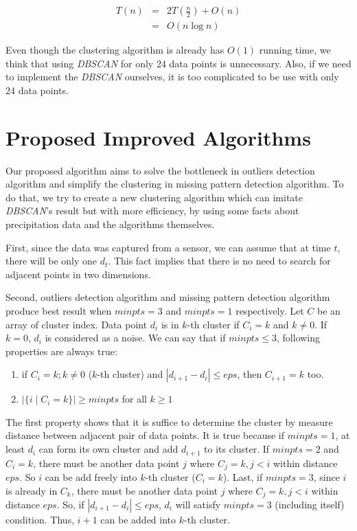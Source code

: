 \documentclass[conference]{IEEEtran}
\begin{document}
\[
\begin{array}{lcl}
T(n) & = & 2T(\frac{n}{2}) + O(n)\\
     & = & O(n \log{n})
\end{array}
\]

Even though the clustering algorithm is already has $O(1)$ running time, we think that using \textit{DBSCAN} for only 24 data points is unnecessary. Also, if we need to implement the \textit{DBSCAN} ourselves, it is too complicated to be use with only 24 data points.

\section{Proposed Improved Algorithms} \label{sec:propose}

Our proposed algorithm aims to solve the bottleneck in outliers detection algorithm and simplify the clustering in missing pattern detection algorithm. To do that, we try to create a new clustering algorithm which can imitate \textit{DBSCAN}'s result but with more efficiency, by using some facts about precipitation data and the algorithms themselves.

First, since the data was captured from a sensor, we can assume that at time $t$, there will be only one $d_{t}$. This fact implies that there is no need to search for adjacent points in two dimensions.

Second, outliers detection algorithm and missing pattern detection algorithm produce best result when $\textit{minpts} = 3$ and $\textit{minpts} = 1$ respectively. Let $C$ be an array of cluster index. Data point $d_{i}$ is in $k$-th cluster if $C_{i} = k$ and $k \neq 0$. If $k = 0$, $d_{i}$ is considered as a noise. We can say that if $\textit{minpts} \le 3$, following properties are always true:

\begin{enumerate}
  \item if $C_{i} = k; k \neq 0$ (\textit{$k$}-th cluster) and $|d_{i+1} - d_{i}| \le \textit{eps}$, then $C_{i+1} = k$ too.
  \item $|\{i \mid C_{i} = k\}| \ge \textit{minpts}$ for all $k \ge 1$ 
\end{enumerate}

The first property shows that it is suffice to determine the cluster by measure distance between adjacent pair of data points. It is true because if $\textit{minpts} = 1$, at least $d_{i}$ can form its own cluster and add $d_{i+1}$ to its cluster. If $\textit{minpts} = 2$ and $C_{i} = k$, there must be another data point $j$ where $C_{j} = k, j < i$ within distance $\textit{eps}$. So $i$ can be add freely into $k$-th cluster ($C_{i} = k$). Last, if $\textit{minpts} = 3$, since $i$ is already in $C_{k}$, there must be another data point $j $ where $C_{j} = k, j < i$ within distance $\textit{eps}$. So, if $|d_{i+1} - d_{i}| \le \textit{eps}$, $d_{i}$ will satisfy $\textit{minpts} = 3$ (including itself) condition. Thus, $i+1$ can be added into $k$-th cluster.
\end{document}
